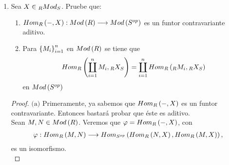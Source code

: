 \documentclass{article}
\begin{document}
\begin{enumerate}[label=\textbf{Ej \arabic*.}]
\begin{proof}
			\begin{align*}
				\functhom{A}{-}{\mathcal{A}}\lrprth{f+g}\lrprth{\alpha}&=F\lrprth{f+g}\lrprth{\alpha}\\
				&=\lrprth{f+g}\alpha=f\alpha+g\alpha\\
				&=Ff\lrprth{\alpha}+Fg\lrprth{\alpha}\\
				\implies \functhom{A}{-}{\mathcal{A}}\lrprth{f+g}&=\functhom{A}{-}{\mathcal{A}}\lrprth{f}+\functhom{A}{-}{\mathcal{A}}\lrprth{g}
			\end{align*}
			De modo que \begin{equation*}
				\functhom{A}{}{\mathcal{A}}:\functhom{B}{C}{\mathcal{A}}\to\functhom{\functhom{A}{B}{\mathcal{A}}}{\functhom{A}{C}{\mathcal{A}}}{Ab}
			\end{equation*}es un morfismo de grupos abelianos. Con lo cual, dado que $Ab$ es una categoría preaditiva (esto ya que la composición de morfismos de grupos abelianos es $\mathbb{Z}$-bilineal), se tiene que $\functhom{A}{}{\mathcal{A}}$ es un funtor aditivo.\\
			La demostración de $b)$ se realiza en forma análoga.\\
		\end{proof}
		\item Sea $X\in\ringbimod{R}{S}{Mod}{lr}$. Pruebe que:
		\begin{enumerate}
			\item $Hom_{R}\left(-,X\right): Mod\left(R\right) \longrightarrow Mod\left({S}^{op}\right)$ es un funtor contravariante aditivo.
			\item Para ${\left\{{M}_{i}\right\}}_{i=1}^{n}$ en $Mod\left(R\right)$ se tiene que
			\begin{align*}
				\ringmodhom{R}{\displaystyle\coprod_{i=1}^{n}M_{i}}{\ringbimod{R}{S}{X}{lr}}=\displaystyle\coprod_{i=1}^{n}\ringmodhom{R}{\ringmod{R}{M_{i}}{l}}{\ringbimod{R}{S}{X}{lr}}
			\end{align*}
			en $Mod\left({S}^{op}\right)$
		\end{enumerate}
		\begin{proof}
			$\boxed{\text{(a)}}$ Primeramente, ya sabemos que $Hom_{R}\left(-,X\right)$ es un funtor contravariante. Entonces bastará probar que éste es aditivo.\\
			
			Sean $M,N \in Mod\left(R\right)$. Veremos que $\varphi=Hom_{R}\left(-,X\right)$, con
			\begin{align*}
				\varphi:Hom_{R}\left(M,N\right)\longrightarrow Hom_{{S}^{op}}\left(Hom_{R}\left(N,X\right),Hom_{R}\left(M,X\right)\right),
			\end{align*}
			es un isomorfismo.\\
			

\end{proof}
\end{enumerate}
\end{document}
